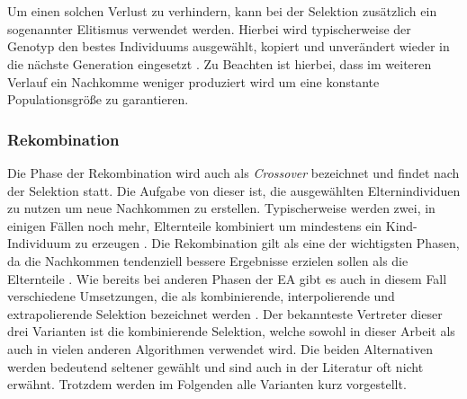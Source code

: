 \\\\
Um einen solchen Verlust zu verhindern, kann bei der Selektion zusätzlich ein sogenannter Elitismus verwendet werden. Hierbei wird typischerweise der Genotyp den bestes Individuums ausgewählt, kopiert und unverändert wieder in die nächste Generation eingesetzt \cite{such2017deep}. Zu Beachten ist hierbei, dass im weiteren Verlauf ein Nachkomme weniger produziert wird um eine konstante Populationsgröße zu garantieren. 

\subsubsection{Rekombination}
\label{subsubsec:ea_recombination}
Die Phase der Rekombination wird auch als \emph{Crossover} bezeichnet und findet nach der Selektion statt. Die Aufgabe von dieser ist, die ausgewählten Elternindividuen zu nutzen um neue Nachkommen zu erstellen. Typischerweise werden zwei, in einigen Fällen noch mehr, Elternteile kombiniert um mindestens ein Kind-Individuum zu erzeugen \cite{weicker2015evolutionare}. Die Rekombination gilt als eine der wichtigsten Phasen, da die Nachkommen tendenziell bessere Ergebnisse erzielen sollen als die Elternteile \cite{russell2013kunstliche}. Wie bereits bei anderen Phasen der \ac{EA} gibt es auch in diesem Fall verschiedene Umsetzungen, die als kombinierende, interpolierende und extrapolierende Selektion bezeichnet werden \cite{weicker2015evolutionare}. Der bekannteste Vertreter dieser drei Varianten ist die kombinierende Selektion, welche sowohl in dieser Arbeit als auch in vielen anderen Algorithmen verwendet wird. Die beiden Alternativen werden bedeutend seltener gewählt und sind auch in der Literatur oft nicht erwähnt. Trotzdem werden im Folgenden alle Varianten kurz vorgestellt.
\\\\
